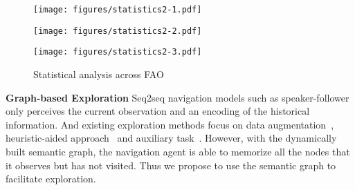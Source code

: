 \documentclass[final]{cvpr}
\begin{document}
\begin{figure*}[t]
\centering
\begin{minipage}{.33\textwidth}
    \centering
    \texttt{[image: figures/statistics2-1.pdf]}
\end{minipage}
\begin{minipage}{.33\textwidth}
    \centering
    \texttt{[image: figures/statistics2-2.pdf]}
\end{minipage}
\begin{minipage}{.33\textwidth}
    \centering
    \texttt{[image: figures/statistics2-3.pdf]}
\end{minipage}
\caption{Statistical analysis across FAO}
\vspace{-9pt}
\label{fig:analysis}
\end{figure*}

\noindent\textbf{Graph-based Exploration} Seq2seq navigation models such as speaker-follower~\cite{fried2018speaker} only perceives the current observation and an encoding of the historical information. And existing exploration methods focus on data augmentation~\cite{tan2019learning}, heuristic-aided approach~\cite{ma2019the} and auxiliary task~\cite{zhu2019vision}. 
However, with the dynamically built semantic graph, the navigation agent is able to memorize all the nodes that it observes but has not visited. 
Thus we propose to use the semantic graph to facilitate exploration. 
\end{document}
